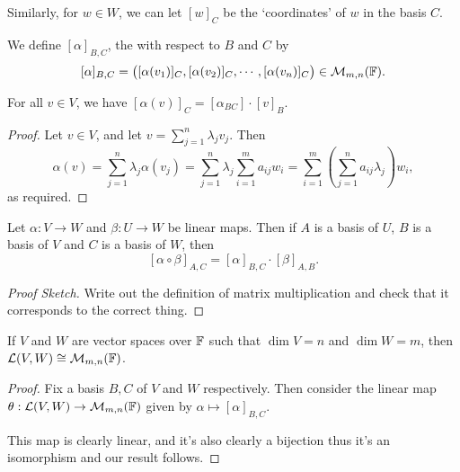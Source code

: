 \documentclass[a4paper]{scrartcl}
\begin{document}
Similarly, for $w \in W$, we can let $[w]_C$ be the `coordinates' of $w$ in the basis $C$.

\begin{definition}
    We define $[\alpha]_{B, C}$, the  with respect to $B$ and $C$ by
    $$
    [\alpha]_{B, C} = \begin{pmatrix}
        [\alpha(v_1)]_C, [\alpha(v_2)]_C, \cdots, [\alpha(v_n)]_C
    \end{pmatrix} \in \mathcal{M}_{m, n}(\mathbb{F}).
    $$ 
\end{definition}

\begin{lemma}
    For all $v \in V$, we have $[\alpha(v)]_C = [\alpha_{BC}] \cdot [v]_B$.
\end{lemma}
\begin{proof}
    Let $v \in V$, and let $v = \sum_{j = 1}^n \lambda_j v_j$. Then
    $$
    \alpha(v) = \sum_{j = 1}^n \lambda_j \alpha(v_j) = \sum_{j = 1}^n \lambda_j \sum_{i = 1}^m a_{ij} w_i = \sum_{i = 1}^m \left(\sum_{j = 1}^n a_{ij} \lambda_j\right) w_i,
    $$
    as required.
\end{proof}

\begin{lemma}
    Let $\alpha: V \rightarrow W$ and $\beta: U \rightarrow W$ be linear maps. Then if $A$ is a basis of $U$, $B$ is a basis of $V$ and $C$ is a basis of $W$, then
    $$
    [\alpha \circ \beta]_{A, C} = [\alpha]_{B, C} \cdot [\beta]_{A, B}.
    $$
\end{lemma}
\begin{proof}[Proof Sketch]
    Write out the definition of matrix multiplication and check that it corresponds to the correct thing.
\end{proof}


\begin{proposition}
    If $V$ and $W$ are vector spaces over $\mathbb{F}$ such that $\dim V = n$ and $\dim W = m$, then $\mathcal{L}(V, W) \cong \mathcal{M}_{m, n}(\mathbb{F})$.
\end{proposition}
\begin{proof}
    Fix a basis $B, C$ of $V$ and $W$ respectively.
    Then consider the linear map
    $
    \theta: \mathcal{L}(V, W) \rightarrow \mathcal{M}_{m, n}(\mathbb{F})
    $ given by $\alpha \mapsto [\alpha]_{B, C}$.

    This map is clearly linear, and it's also clearly a bijection thus it's an isomorphism and our result follows.
\end{proof}
\end{document}
